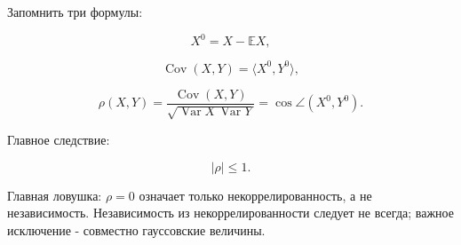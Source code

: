 \documentclass[
  11pt,
  a4paper,
]{article}
\begin{document}
Запомнить три формулы:

\[
X^0=X-\mathbb EX,
\]

\[
\operatorname{Cov}(X,Y)=\langle X^0,Y^0\rangle,
\]

\[
\rho(X,Y)=
\frac{\operatorname{Cov}(X,Y)}
{\sqrt{\operatorname{Var}X\,\operatorname{Var}Y}}
=
\cos\angle(X^0,Y^0).
\]

Главное следствие:

\[
|\rho|\le1.
\]

Главная ловушка: \(\rho=0\) означает только некоррелированность, а не
независимость. Независимость из некоррелированности следует не всегда;
важное исключение - совместно гауссовские величины.

\newpage
\end{document}
